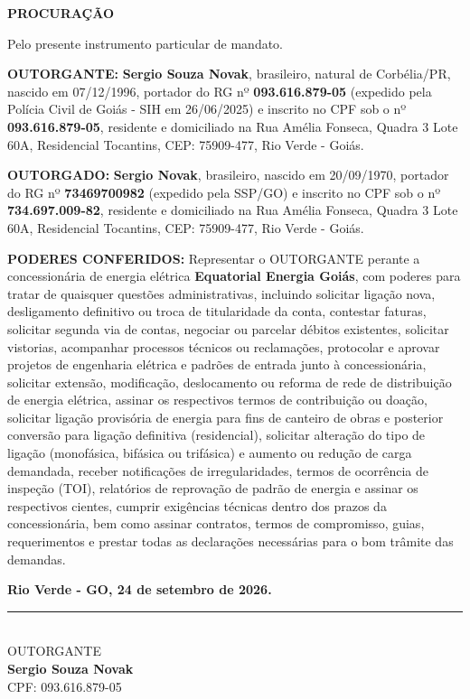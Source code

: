 \documentclass[12pt,a4paper]{article}
\begin{document}
\sloppy

\begin{center}
    {\huge \textbf{PROCURAÇÃO}}
\end{center}

\vspace{0.4cm}

Pelo presente instrumento particular de mandato.

\vspace{0.4cm}

\textbf{OUTORGANTE:} \textbf{Sergio Souza Novak}, brasileiro, natural de Corbélia/PR, nascido em 07/12/1996, portador do RG nº \textbf{093.616.879-05} (expedido pela Polícia Civil de Goiás - SIH em 26/06/2025) e inscrito no CPF sob o nº \textbf{093.616.879-05}, residente e domiciliado na Rua Amélia Fonseca, Quadra 3 Lote 60A, Residencial Tocantins, CEP: 75909-477, Rio Verde - Goiás.

\vspace{0.3cm}

\textbf{OUTORGADO:} \textbf{Sergio Novak}, brasileiro, nascido em 20/09/1970, portador do RG nº \textbf{73469700982} (expedido pela SSP/GO) e inscrito no CPF sob o nº \textbf{734.697.009-82}, residente e domiciliado na Rua Amélia Fonseca, Quadra 3 Lote 60A, Residencial Tocantins, CEP: 75909-477, Rio Verde - Goiás.

\vspace{0.3cm}

\textbf{PODERES CONFERIDOS:} Representar o OUTORGANTE perante a concessionária de energia elétrica \textbf{Equatorial Energia Goiás}, com poderes para tratar de quaisquer questões administrativas, incluindo solicitar ligação nova, desligamento definitivo ou troca de titularidade da conta, contestar faturas, solicitar segunda via de contas, negociar ou parcelar débitos existentes, solicitar vistorias, acompanhar processos técnicos ou reclamações, protocolar e aprovar projetos de engenharia elétrica e padrões de entrada junto à concessionária, solicitar extensão, modificação, deslocamento ou reforma de rede de distribuição de energia elétrica, assinar os respectivos termos de contribuição ou doação, solicitar ligação provisória de energia para fins de canteiro de obras e posterior conversão para ligação definitiva (residencial), solicitar alteração do tipo de ligação (monofásica, bifásica ou trifásica) e aumento ou redução de carga demandada, receber notificações de irregularidades, termos de ocorrência de inspeção (TOI), relatórios de reprovação de padrão de energia e assinar os respectivos cientes, cumprir exigências técnicas dentro dos prazos da concessionária, bem como assinar contratos, termos de compromisso, guias, requerimentos e prestar todas as declarações necessárias para o bom trâmite das demandas.

\vspace{1cm}

\noindent \textbf{Rio Verde - GO, 24 de setembro de 2026.}

\vspace{1.5cm}

\begin{center}
    \rule{0.65\textwidth}{0.4pt} \\[0.2cm]
    OUTORGANTE \\[0.2cm]
    \textbf{Sergio Souza Novak} \\
    CPF: 093.616.879-05
\end{center}
\end{document}
